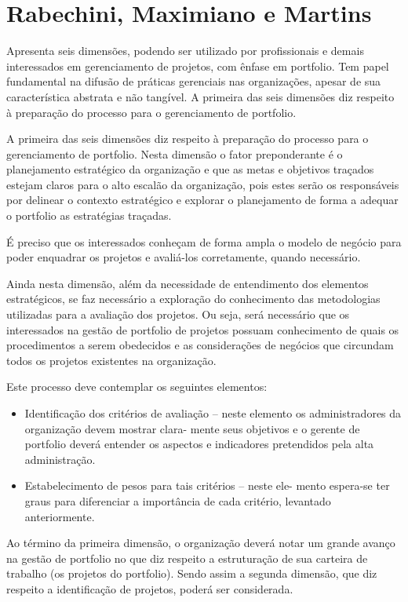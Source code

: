 \documentclass[12pt,a4paper,ruledheader,tocpage=prefix,floatnumber=continuous,pagestart=folhaderosto,font=times]{abnt}
\begin{document}
\section{Rabechini, Maximiano e Martins}
Apresenta seis dimensões, podendo ser utilizado por profissionais e demais interessados em gerenciamento de projetos, com ênfase em portfolio. Tem papel
fundamental na difusão de práticas gerenciais nas organizações, apesar de sua característica abstrata e não tangível. A primeira das seis dimensões diz 
respeito à preparação do processo para o gerenciamento de portfolio\cite{rabechini}. 

A primeira das seis dimensões diz respeito à preparação do processo para o gerenciamento de portfolio. Nesta dimensão o fator preponderante  
é o planejamento estratégico da organização e que as metas e objetivos traçados estejam claros para o alto escalão da organização, 
pois estes serão os responsáveis por delinear o contexto estratégico e explorar o planejamento de forma a adequar o portfolio as estratégias traçadas. 

É preciso que os interessados conheçam de forma ampla o modelo de negócio para poder enquadrar os projetos e avaliá-los
corretamente, quando necessário.\cite{rabechini}

Ainda nesta dimensão, além da necessidade de entendimento dos elementos estratégicos, se faz necessário a exploração do conhecimento das metodologias 
utilizadas para a avaliação dos projetos. Ou seja, será necessário que os interessados na gestão de portfolio de projetos possuam conhecimento de quais 
os procedimentos a serem obedecidos e as considerações de negócios que circundam todos os projetos existentes na organização.

Este processo deve contemplar os seguintes elementos:\cite{rabechini}

\begin{itemize}
 \item Identificação dos critérios de avaliação – neste elemento
os administradores da organização devem mostrar clara-
mente seus objetivos e o gerente de portfolio deverá
entender os aspectos e indicadores pretendidos pela alta
administração.
\item Estabelecimento de pesos para tais critérios – neste ele-
mento espera-se ter graus para diferenciar a importância
de cada critério, levantado anteriormente.
\end{itemize}

Ao término da primeira dimensão, o organização deverá notar um grande avanço na gestão de portfolio no que diz respeito a estruturação de sua carteira 
de trabalho (os projetos do portfolio). Sendo assim a segunda dimensão, que diz respeito a identificação de projetos, poderá ser considerada.
\end{document}
